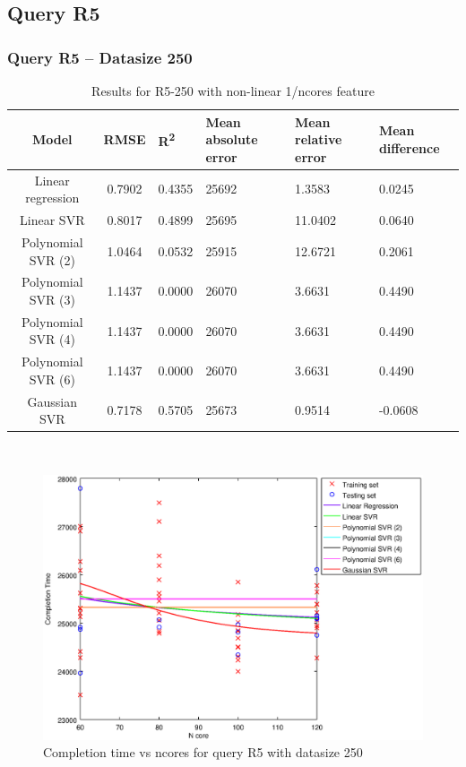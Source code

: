 \documentclass[a4paper,11pt]{article}
\begin{document}
\newpage
\subsection{Query R5}
\subsubsection{Query R5 -- Datasize 250}
\begin{table}[H]
	\centering
	\begin{adjustbox}{center}
		\begin{tabular}{c | c M{1.2cm} M{2.5cm} M{2.5cm} M{1.8cm}}
			Model & RMSE & R\textsuperscript{2} & Mean absolute error & Mean relative error & Mean difference \tabularnewline
			\hline
			Linear regression & 0.7902 & 0.4355 &  25692 & 1.3583 & 0.0245 \\
			Linear SVR & 0.8017 & 0.4899 &  25695 & 11.0402 & 0.0640 \\
			Polynomial SVR (2) & 1.0464 & 0.0532 &  25915 & 12.6721 & 0.2061 \\
			Polynomial SVR (3) & 1.1437 & 0.0000 &  26070 & 3.6631 & 0.4490 \\
			Polynomial SVR (4) & 1.1437 & 0.0000 &  26070 & 3.6631 & 0.4490 \\
			Polynomial SVR (6) & 1.1437 & 0.0000 &  26070 & 3.6631 & 0.4490 \\
			Gaussian SVR & 0.7178 & 0.5705 &  25673 & 0.9514 & -0.0608 \\
		\end{tabular}
	\end{adjustbox}
	\\
	\caption{Results for R5-250 with non-linear 1/ncores feature}
	\label{table_R5_prediction_all}
\end{table}

\begin {figure}[hbtp]
\centering
\includegraphics[width=\textwidth]{output/R5_250_NO_72_90_1_OVER_NCORES/plot_R5_250.eps}
\caption {Completion time vs ncores for query R5 with datasize 250}
\end {figure}
\end{document}
